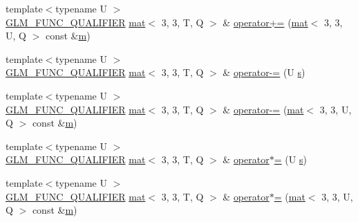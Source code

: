 \begin{DoxyCompactItemize}
\item 
{\footnotesize template$<$typename U $>$ }\\\hyperlink{setup_8hpp_a33fdea6f91c5f834105f7415e2a64407}{G\+L\+M\+\_\+\+F\+U\+N\+C\+\_\+\+Q\+U\+A\+L\+I\+F\+I\+ER} \hyperlink{structglm_1_1mat}{mat}$<$ 3, 3, T, Q $>$ \& \hyperlink{structglm_1_1mat_3_013_00_013_00_01_t_00_01_q_01_4_abc45d059ceb749e219587c8d50e4ecbb}{operator+=} (\hyperlink{structglm_1_1mat}{mat}$<$ 3, 3, U, Q $>$ const \&\hyperlink{_s_d_l__opengl__glext_8h_af593500c283bf1a787a6f947f503a5c2}{m})
\item 
{\footnotesize template$<$typename U $>$ }\\\hyperlink{setup_8hpp_a33fdea6f91c5f834105f7415e2a64407}{G\+L\+M\+\_\+\+F\+U\+N\+C\+\_\+\+Q\+U\+A\+L\+I\+F\+I\+ER} \hyperlink{structglm_1_1mat}{mat}$<$ 3, 3, T, Q $>$ \& \hyperlink{structglm_1_1mat_3_013_00_013_00_01_t_00_01_q_01_4_acd25696de3d8abb588896e405fa0e314}{operator-\/=} (U \hyperlink{_s_d_l__opengl_8h_a4af680a6c683f88ed67b76f207f2e6e4}{s})
\item 
{\footnotesize template$<$typename U $>$ }\\\hyperlink{setup_8hpp_a33fdea6f91c5f834105f7415e2a64407}{G\+L\+M\+\_\+\+F\+U\+N\+C\+\_\+\+Q\+U\+A\+L\+I\+F\+I\+ER} \hyperlink{structglm_1_1mat}{mat}$<$ 3, 3, T, Q $>$ \& \hyperlink{structglm_1_1mat_3_013_00_013_00_01_t_00_01_q_01_4_ab89e6f23520371a3c2294d906ec59d07}{operator-\/=} (\hyperlink{structglm_1_1mat}{mat}$<$ 3, 3, U, Q $>$ const \&\hyperlink{_s_d_l__opengl__glext_8h_af593500c283bf1a787a6f947f503a5c2}{m})
\item 
{\footnotesize template$<$typename U $>$ }\\\hyperlink{setup_8hpp_a33fdea6f91c5f834105f7415e2a64407}{G\+L\+M\+\_\+\+F\+U\+N\+C\+\_\+\+Q\+U\+A\+L\+I\+F\+I\+ER} \hyperlink{structglm_1_1mat}{mat}$<$ 3, 3, T, Q $>$ \& \hyperlink{structglm_1_1mat_3_013_00_013_00_01_t_00_01_q_01_4_a17980b36cc9b56a4826a855a21ca4229}{operator$\ast$=} (U \hyperlink{_s_d_l__opengl_8h_a4af680a6c683f88ed67b76f207f2e6e4}{s})
\item 
{\footnotesize template$<$typename U $>$ }\\\hyperlink{setup_8hpp_a33fdea6f91c5f834105f7415e2a64407}{G\+L\+M\+\_\+\+F\+U\+N\+C\+\_\+\+Q\+U\+A\+L\+I\+F\+I\+ER} \hyperlink{structglm_1_1mat}{mat}$<$ 3, 3, T, Q $>$ \& \hyperlink{structglm_1_1mat_3_013_00_013_00_01_t_00_01_q_01_4_a7c00c95a88f92ef9bf08db8a921c6e83}{operator$\ast$=} (\hyperlink{structglm_1_1mat}{mat}$<$ 3, 3, U, Q $>$ const \&\hyperlink{_s_d_l__opengl__glext_8h_af593500c283bf1a787a6f947f503a5c2}{m})

\end{DoxyCompactItemize}
